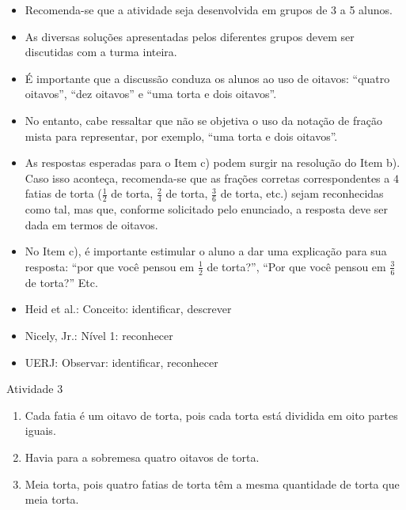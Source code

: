 \begin{multicols}{2}
  \vspace{.1cm}

  \vspace{.1cm}

\begin{itemize} %
    \item       Recomenda-se que a atividade seja desenvolvida em grupos de 3 a 5 alunos.
    \item       As diversas soluções apresentadas pelos diferentes grupos devem ser discutidas com a turma inteira.
    \item       É importante que a discussão conduza os alunos ao uso de oitavos:       ``quatro oitavos'',       ``dez oitavos''     e       ``uma torta e dois oitavos''.
    \item       No entanto, cabe ressaltar que não se objetiva o uso da notação de fração mista para representar, por exemplo,       ``uma torta e dois oitavos''.
    \item       As respostas esperadas para o Item c) podem surgir na resolução do Item b). Caso isso aconteça, recomenda-se que as frações corretas correspondentes a       $4$ fatias de torta ($\frac{1}{2}$ de torta,       $\frac{2}{4}$ de torta,       $\frac{3}{6}$ de torta, etc.) sejam reconhecidas como tal, mas que, conforme solicitado pelo enunciado, a resposta deve ser dada em termos de oitavos.
    \item       No Item c), é importante estimular o aluno a dar uma explicação para sua resposta: ``por que você pensou em       $\frac{1}{2}$ de torta?'', ``Por que você pensou em       $\frac{3}{6}$ de torta?'' Etc.
\end{itemize} %


  \vspace{.1cm}

 \vspace{.1cm}
\begin{itemize} %
    \item       Heid et al.: Conceito: identificar, descrever
    \item       Nicely, Jr.: Nível 1: reconhecer
    \item       UERJ: Observar: identificar, reconhecer
\end{itemize} %




\begin{resposta*}{Atividade 3}
\begin{enumerate} [\quad a)] %
    \item       Cada fatia é um oitavo de torta, pois cada torta está dividida em oito partes iguais.
    \item       Havia para a sobremesa quatro oitavos de torta.
    \item       Meia torta, pois quatro fatias de torta têm a mesma quantidade de torta que meia torta.
\end{enumerate} %


\end{resposta*}
\end{multicols}
